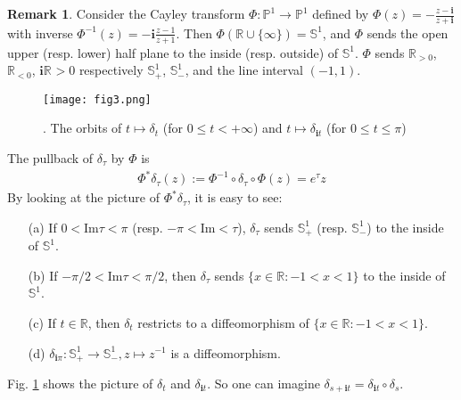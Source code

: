 \documentclass[12pt,b5paper,notitlepage]{article}
\theoremstyle{definition}
\newtheorem{rem}[df]{Remark}
\theoremstyle{plain}
\newcommand{\im}{\mathbf{i}}
\newcommand{\Pbb}{\mathbb P}
\newcommand{\Rbb}{\mathbb R}
\newcommand{\Sbb}{{\mathbb S}}
\newcommand{\Imag}{\mathrm{Im}}
\newcommand{\dps}{\displaystyle}
\numberwithin{equation}{section}
\begin{document}
\begin{rem}\label{lbb15}
Consider the Cayley transform $\Phi:\Pbb^1\rightarrow\Pbb^1$ defined by $\dps\Phi(z)=-\frac{z-\im}{z+\im}$ with inverse $\dps\Phi^{-1}(z)=-\im \frac{z-1}{z+1}$. Then $\Phi(\Rbb\cup\{\infty\})=\Sbb^1$, and $\Phi$ sends the open upper (resp. lower) half plane to the inside (resp. outside) of $\Sbb^1$. $\Phi$ sends $\Rbb_{>0}$, $\Rbb_{<0}$, $\im\Rbb_{}>0$ respectively $\Sbb^1_+$, $\Sbb^1_-$, and the line interval $(-1,1)$.

\begin{figure}[h]
	\centering
	\texttt{[image: fig3.png]}
	\caption{. The  orbits of $t\mapsto\delta_t$ (for $0\leq t<+\infty$) and $t\mapsto\delta_{\im t}$ (for $0\leq t\leq\pi$)}\label{lb101}
\end{figure}

The pullback of $\delta_\tau$ by $\Phi$ is
\begin{align}
\Phi^*\delta_\tau(z):=\Phi^{-1}\circ\delta_\tau\circ \Phi(z)=e^\tau z
\end{align} 
By looking at the picture of $\Phi^*\delta_\tau$, it is easy to see:
\begin{itemize}
\item[(a)] If $0<\Imag \tau<\pi$ (resp. $-\pi<\Imag<\tau$), $\delta_\tau$ sends $\Sbb^1_+$ (resp. $\Sbb^1_-$) to the inside of $\Sbb^1$.
\item[(b)] If $-\pi/2<\Imag\tau<\pi/2$, then $\delta_\tau$ sends $\{x\in\Rbb:-1<x<1\}$ to the inside of $\Sbb^1$.
\item[(c)] If $t\in\Rbb$, then $\delta_t$ restricts to a diffeomorphism of $\{x\in\Rbb:-1<x<1\}$.
\item[(d)] $\delta_{\im\pi}:\Sbb^1_+\rightarrow\Sbb^1_-,z\mapsto z^{-1}$ is a diffeomorphism.
\end{itemize}
Fig. \ref{lb101} shows the picture of $\delta_t$ and $\delta_{\im t}$. So one can imagine $\delta_{s+\im t}=\delta_{\im t}\circ\delta_s$.   \hfill\qedsymbol
\end{rem}





\subsection{}
\end{document}

